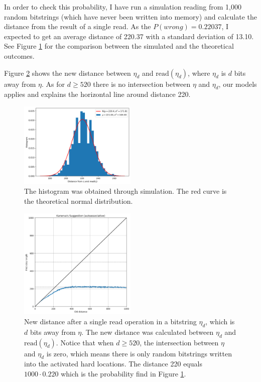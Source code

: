 In order to check this probability, I have run a simulation reading from 1,000 random bitstrings (which have never been written into memory) and calculate the distance from the result of a single read. As the $P(wrong) = 0.22037$, I expected to get an average distance of 220.37 with a standard deviation of 13.10. See Figure \ref{fig:sdm-read-random-bs} for the comparison between the simulated and the theoretical outcomes.

Figure \ref{fig:sdm-single-read-dist} shows the new distance between $\eta_d$ and $\text{read}(\eta_d)$, where $\eta_d$ is $d$ bits away from $\eta$. As for $d \ge 520$ there is no intersection between $\eta$ and $\eta_d$, our models applies and explains the horizontal line around distance 220.

\begin{figure}[!htb]
  \centering
  \includegraphics[width=0.5\textwidth]{./images02/autocorrelation/read-random-bs.png}

  \caption{The histogram was obtained through simulation. The red curve is the theoretical normal distribution.}
  \label{fig:sdm-read-random-bs}
\end{figure}

\begin{figure}[!htb]
  \centering
  \includegraphics[width=0.5\textwidth]{./images02/autocorrelation/single-read-dist.png}

  \caption{New distance after a single read operation in a bitstring $\eta_d$, which is $d$ bits away from $\eta$. The new distance was calculated between $\eta_d$ and $\text{read}(\eta_d)$. Notice that when $d \ge 520$, the intersection between $\eta$ and $\eta_d$ is zero, which means there is only random bitstrings written into the activated hard locations. The distance 220 equals $1000 \cdot 0.220$ which is the probability find in Figure \ref{fig:sdm-read-random-bs}.}
  \label{fig:sdm-single-read-dist}
\end{figure}
